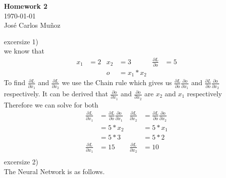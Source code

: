 \documentclass[12pt,english]{article}
\begin{document}
\begin{center}
    \Large
    \textbf{Homework 2}\\
    \small
    \today\\
    \large
    Jos\'{e} Carlos Mu\~{n}oz
\end{center}
excersize 1)\\
we know that
\begin{align*}
x_1&=2 & x_2&= 3 & \frac{\partial L}{\partial o}&=5\\
     &     & o   &= x_1 * x_2 
\end{align*}
To find $\frac{\partial L}{\partial x_1}$ and $\frac{\partial L}{\partial x_2}$ we use the Chain rule which gives us $\frac{\partial L}{\partial o}\frac{\partial o}{\partial x_1}$ and $\frac{\partial L}{\partial o}\frac{\partial o}{\partial x_2}$ respectively. It can be derived that $\frac{\partial o}{\partial x_1}$ and $\frac{\partial o}{\partial x_2}$ are $x_2$ and $x_1$ respectively\\
Therefore we can solve for both\\
\begin{align*}
\frac{\partial L}{\partial x_1}&=\frac{\partial L}{\partial o}\frac{\partial o}{\partial x_1} & \frac{\partial L}{\partial x_2}&=\frac{\partial L}{\partial o}\frac{\partial o}{\partial x_2}\\
                                      &=5*x_2  &  &=5 *x_1\\
                                      &=5*3  &  &=5 *2\\
\frac{\partial L}{\partial x_1}&=15  &  \frac{\partial L}{\partial x_2}&=10\\
\end{align*}
excersize 2)\\
The Neural Network is as follows.
\newcommand{\inputnum}{2}  
\newcommand{\hiddennum}{2}   
\newcommand{\outputnum}{1}  
\end{document}
